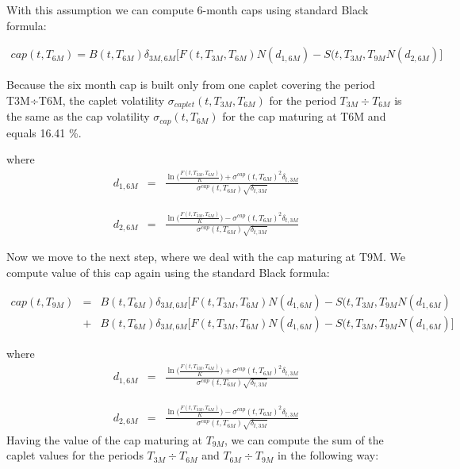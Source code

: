 \documentclass[11pt]{article}
\numberwithin{equation}{subsection}
\begin{document}
With this assumption we can
compute 6-month caps using standard Black formula:

\begin{eqnarray*}
	cap(t, T_{6M}) = B(t, T_{6M}) \delta_{3M,6M} \big[ F(t, T_{3M}, T_{6M}) N(d_{1,6M}) - S(t, T_{3M}, T_{9M}N(d_{2,6M}) \big]
\end{eqnarray*}


Because the six month cap is built only from one caplet covering the period T3M÷T6M, the caplet volatility \(\sigma_{caplet}(t, T_{3M}, T_{6M})\) for the period \(T_{3
	M} ÷T_{6M}\) is the same as the cap volatility \(\sigma_{cap}(t, T_{6M})\) for the cap maturing at T6M and equals 16.41 \%.


where 
\begin{eqnarray*}
	d_{1,6M}&=&\frac{\ln\Big(\frac{F(t, T_{3M}, T_{6M})}{K}\Big) + \sigma^{cap}(t, T_{6M})^2\delta_{t, 3M}}{\sigma^{cap}(t, T_{6M})\sqrt{\delta_{t,3M}}}
\end{eqnarray*}

\begin{eqnarray*}
	d_{2,6M}&=&\frac{\ln\Big(\frac{F(t, T_{3M}, T_{6M})}{K}\Big) - \sigma^{cap}(t, T_{6M})^2\delta_{t, 3M}}{\sigma^{cap}(t, T_{6M})\sqrt{\delta_{t,3M}}}
\end{eqnarray*}


Now we move to the next step, where we deal with the cap maturing at T9M. We compute value of this cap again using the standard Black formula:

\begin{eqnarray*}
	cap(t, T_{9M}) &=& B(t, T_{6M}) \delta_{3M,6M} \big[ F(t, T_{3M}, T_{6M}) N(d_{1,6M})- S(t, T_{3M}, T_{9M}N(d_{1,6M})   \\
	&+& B(t, T_{6M}) \delta_{3M,6M} [ F(t, T_{3M}, T_{6M}) N(d_{1,6M}) - S(t, T_{3M}, T_{9M}N(d_{1,6M}) \big]
\end{eqnarray*}


where 
\begin{eqnarray*}
	d_{1,6M}&=&\frac{\ln\Big(\frac{F(t, T_{3M}, T_{6M})}{K}\Big) + \sigma^{cap}(t, T_{6M})^2\delta_{t, 3M}}{\sigma^{cap}(t, T_{6M})\sqrt{\delta_{t,3M}}}
\end{eqnarray*}

\begin{eqnarray*}
	d_{2,6M}&=&\frac{\ln\Big(\frac{F(t, T_{3M}, T_{6M})}{K}\Big) - \sigma^{cap}(t, T_{6M})^2\delta_{t, 3M}}{\sigma^{cap}(t, T_{6M})\sqrt{\delta_{t,3M}}}
\end{eqnarray*}
Having the value of the cap maturing at \(T_{9M}\), we can compute the sum of the caplet values
for the periods \(T_{3M} \div T_{6M}\) and \(T_{6M} \div T_{9M}\) in the following way:
\end{document}
